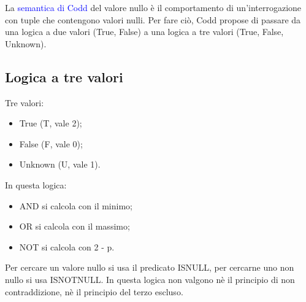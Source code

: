 \label{Logica a tre valori}

La \textcolor{blue}{semantica di Codd} del valore nullo è il comportamento di un'interrogazione con tuple che contengono valori nulli. Per fare ciò, Codd propose di passare da una logica a due valori (True, False) a una logica a tre valori (True, False, Unknown).

\subsection{Logica a tre valori}

Tre valori:

\begin{itemize}
    \item True (T, vale 2);
    \item False (F, vale 0);
    \item Unknown (U, vale 1).
\end{itemize}

In questa logica:

\begin{itemize}
    \item AND si calcola con il minimo;
    \item OR si calcola con il massimo;
    \item NOT si calcola con 2 - p. 
\end{itemize}

Per cercare un valore nullo si usa il predicato ISNULL, per cercarne uno non nullo si usa ISNOTNULL.
In questa logica non valgono nè il principio di non contraddizione, nè il principio del terzo escluso.
